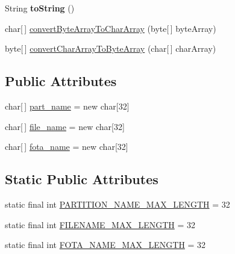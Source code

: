 \begin{DoxyCompactItemize}
\item 
\hypertarget{classcom_1_1casual__dev_1_1libpitX_1_1PitEntry_ae7e7bc080f53df0e86f7bfb966e38159}{String {\bfseries to\-String} ()}\label{classcom_1_1casual__dev_1_1libpitX_1_1PitEntry_ae7e7bc080f53df0e86f7bfb966e38159}

\item 
char\mbox{[}$\,$\mbox{]} \hyperlink{classcom_1_1casual__dev_1_1libpitX_1_1PitEntry_ac291912ea4f4cda011151311dfa61d82}{convert\-Byte\-Array\-To\-Char\-Array} (byte\mbox{[}$\,$\mbox{]} byte\-Array)
\item 
byte\mbox{[}$\,$\mbox{]} \hyperlink{classcom_1_1casual__dev_1_1libpitX_1_1PitEntry_a21223a75c18e7be3b39028a09c941137}{convert\-Char\-Array\-To\-Byte\-Array} (char\mbox{[}$\,$\mbox{]} char\-Array)
\end{DoxyCompactItemize}
\subsection*{Public Attributes}
\begin{DoxyCompactItemize}
\item 
char\mbox{[}$\,$\mbox{]} \hyperlink{classcom_1_1casual__dev_1_1libpitX_1_1PitEntry_a5e197e4cf04138a9e720a994180c201a}{part\-\_\-name} = new char\mbox{[}32\mbox{]}
\item 
char\mbox{[}$\,$\mbox{]} \hyperlink{classcom_1_1casual__dev_1_1libpitX_1_1PitEntry_ad93dbdb15b0bb12a5d9d11b4c0c39bc3}{file\-\_\-name} = new char\mbox{[}32\mbox{]}
\item 
char\mbox{[}$\,$\mbox{]} \hyperlink{classcom_1_1casual__dev_1_1libpitX_1_1PitEntry_a2ef9ed0e10b3ab23970737151f0a4fdb}{fota\-\_\-name} = new char\mbox{[}32\mbox{]}
\end{DoxyCompactItemize}
\subsection*{Static Public Attributes}
\begin{DoxyCompactItemize}
\item 
static final int \hyperlink{classcom_1_1casual__dev_1_1libpitX_1_1PitEntry_a05a88dc71b70a2b50683401e40ee749c}{P\-A\-R\-T\-I\-T\-I\-O\-N\-\_\-\-N\-A\-M\-E\-\_\-\-M\-A\-X\-\_\-\-L\-E\-N\-G\-T\-H} = 32
\item 
static final int \hyperlink{classcom_1_1casual__dev_1_1libpitX_1_1PitEntry_aa49ecaa5b5e55f512423b3f0389f0c57}{F\-I\-L\-E\-N\-A\-M\-E\-\_\-\-M\-A\-X\-\_\-\-L\-E\-N\-G\-T\-H} = 32
\item 
static final int \hyperlink{classcom_1_1casual__dev_1_1libpitX_1_1PitEntry_a0261d2e80e710971cdb7bdff99a9b3ee}{F\-O\-T\-A\-\_\-\-N\-A\-M\-E\-\_\-\-M\-A\-X\-\_\-\-L\-E\-N\-G\-T\-H} = 32
\end{DoxyCompactItemize}


